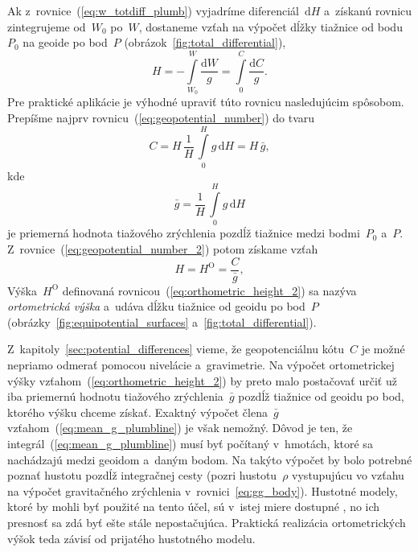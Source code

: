 \documentclass[a4paper, 12pt]{book}
\newcommand{\diff}{\mathrm d}
\begin{document}
Ak z~rovnice~(\ref{eq:w_totdiff_plumb}) vyjadríme diferenciál~$\diff H$ 
a~získanú rovnicu zintegrujeme od~$W_0$ po~$W$, dostaneme vzťah na výpočet 
dĺžky tiažnice od bodu~$P_0$ na geoide po bod~$P$ 
(obrázok~\ref{fig:total_differential}),
%
\begin{equation}
\label{eq:orthometric_height_1}
H = -\int\limits_{W_0}^{W} \frac{\diff W}{g} = \int\limits_{0}^{C} \frac{\diff 
C}{g}{.}
\end{equation}
%
Pre praktické aplikácie je výhodné upraviť túto rovnicu nasledujúcim spôsobom.  
Prepíšme najprv rovnicu~(\ref{eq:geopotential_number}) do tvaru 
\parencite{MoritzPhysicalGeodesy}
%
\begin{equation}
\label{eq:geopotential_number_2}
C = H \, \frac{1}{H} \, \int\limits_0^H g \, \diff H = H \, \bar{g}{,}
\end{equation}
%
kde
%
\begin{equation}
\label{eq:mean_g_plumbline}
\bar{g} = \frac{1}{H} \, \int\limits_0^H g \, \diff H
\end{equation}
%
je priemerná hodnota tiažového zrýchlenia pozdĺž tiažnice medzi bodmi~$P_0$ 
a~$P$.  Z~rovnice~(\ref{eq:geopotential_number_2}) potom získame vzťah
%
\begin{equation}
\label{eq:orthometric_height_2}
H = H^\mathrm{O} = \frac{C}{\bar{g}}{,}
\end{equation}
%
Výška~$H^\mathrm{O}$ definovaná rovnicou~(\ref{eq:orthometric_height_2}) sa 
nazýva \emph{ortometrická výška} a~udáva dĺžku tiažnice od geoidu po bod~$P$ 
(obrázky~\ref{fig:equipotential_surfaces} a~\ref{fig:total_differential}).

Z~kapitoly~\ref{sec:potential_differences} vieme, že geopotenciálnu kótu~$C$ je 
možné nepriamo odmerať pomocou nivelácie a~gravimetrie.  Na výpočet 
ortometrickej výšky vzťahom~(\ref{eq:orthometric_height_2}) by preto malo 
postačovať určiť už iba priemernú hodnotu tiažového zrýchlenia~$\bar{g}$ pozdĺž 
tiažnice od geoidu po bod, ktorého výšku chceme získať.  Exaktný výpočet 
člena~$\bar{g}$ vzťahom~(\ref{eq:mean_g_plumbline}) je však nemožný.  Dôvod je 
ten, že integrál~(\ref{eq:mean_g_plumbline}) musí byť počítaný v~hmotách, ktoré 
sa nachádzajú medzi geoidom a~daným bodom.  Na takýto výpočet by bolo potrebné 
poznať hustotu pozdĺž integračnej cesty (pozri hustotu~$\rho$ vystupujúcu vo 
vzťahu na výpočet gravitačného zrýchlenia v~rovnici~\ref{eq:gg_body}).  
Hustotné modely, ktoré by mohli byť použité na tento účel, sú v~istej miere 
dostupné \parencite[napríklad][]{Sheng2019}, no ich presnosť sa zdá byť ešte 
stále nepostačujúca.  Praktická realizácia ortometrických výšok teda závisí od 
prijatého hustotného modelu.
\end{document}
